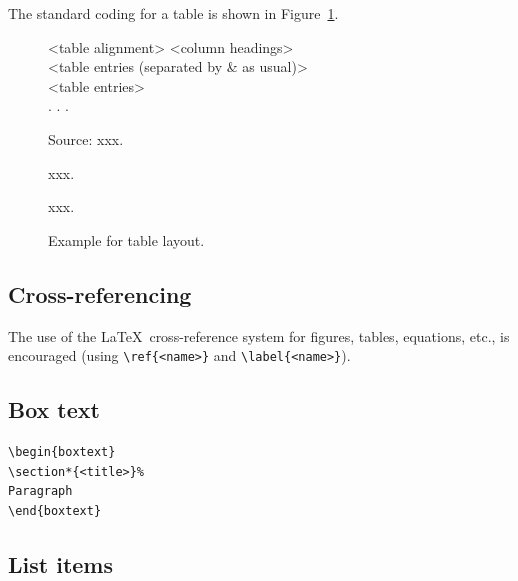 \documentclass[AMA,STIX1COL]{WileyNJD-v2}
\begin{document}
The standard coding for a table is shown in Figure~\ref{F2}.

\begin{figure}[h]
\setlength{\fboxsep}{0pt}%
\setlength{\fboxrule}{0pt}%
\begin{center}
\begin{boxedverbatim}
\begin{table}
\caption{<Table caption>}
\centering
\begin{tabular}{<table alignment>}
\toprule
<column headings>\\
\midrule
<table entries
(separated by & as usual)>\\
<table entries>\\
.
.
.\\
\bottomrule
\end{tabular}
\begin{tablenotes}
\item Source: xxx.
\item[1] xxx.
\item[2] xxx.
\end{tablenotes}
\end{table}
\end{boxedverbatim}
\end{center}
\caption{Example for table layout.\label{F2}}
\end{figure}

\subsection{Cross-referencing}
The use of the \LaTeX\ cross-reference system
for figures, tables, equations, etc., is encouraged
(using \verb"\ref{<name>}" and \verb"\label{<name>}").

\subsection{Box text}

\begin{verbatim}
\begin{boxtext}
\section*{<title>}%
Paragraph
\end{boxtext}
\end{verbatim}

\subsection{List items}
\end{document}
